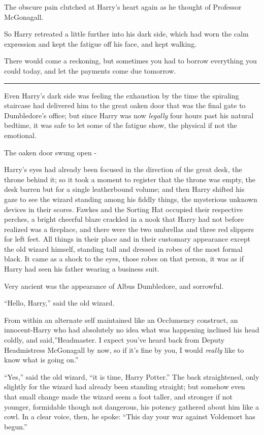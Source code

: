 The obscure pain clutched at Harry's heart again as he thought of
Professor McGonagall.

So Harry retreated a little further into his dark side, which had worn
the calm expression and kept the fatigue off his face, and kept walking.

There would come a reckoning, but sometimes you had to borrow everything
you could today, and let the payments come due tomorrow.

\begin{center}\rule{3in}{0.4pt}\end{center}

Even Harry's dark side was feeling the exhaustion by the time the
spiraling staircase had delivered him to the great oaken door that was
the final gate to Dumbledore's office; but since Harry was now
\emph{legally} four hours past his natural bedtime, it was safe to let
some of the fatigue show, the physical if not the emotional.

The oaken door swung open -

Harry's eyes had already been focused in the direction of the great
desk, the throne behind it; so it took a moment to register that the
throne was empty, the desk barren but for a single leatherbound volume;
and then Harry shifted his gaze to see the wizard standing among his
fiddly things, the mysterious unknown devices in their scores. Fawkes
and the Sorting Hat occupied their respective perches, a bright cheerful
blaze crackled in a nook that Harry had not before realized was a
fireplace, and there were the two umbrellas and three red slippers for
left feet. All things in their place and in their customary appearance
except the old wizard himself, standing tall and dressed in robes of the
most formal black. It came as a shock to the eyes, those robes on that
person, it was as if Harry had seen his father wearing a business suit.

Very ancient was the appearance of Albus Dumbledore, and sorrowful.

``Hello, Harry,'' said the old wizard.

From within an alternate self maintained like an Occlumency construct,
an innocent-Harry who had absolutely no idea what was happening inclined
his head coldly, and said,''Headmaster. I expect you've heard back from
Deputy Headmistress McGonagall by now, so if it's fine by you, I would
\emph{really} like to know what is going on.''

``Yes,'' said the old wizard, ``it is time, Harry Potter.'' The back
straightened, only slightly for the wizard had already been standing
straight; but somehow even that small change made the wizard seem a foot
taller, and stronger if not younger, formidable though not dangerous,
his potency gathered about him like a cowl. In a clear voice, then, he
spoke: ``This day your war against Voldemort has begun.''

